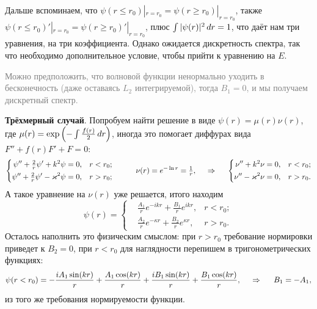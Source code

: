 Дальше вспоминаем, что $\psi(r \leq r_0) |_{r=r_0} = \psi(r \geq r_0) |_{r=r_0}$, также $\psi(r \leq r_0)' |_{r=r_0} = \psi(r \geq r_0)' |_{r=r_0}$, плюс $\int |\psi(r)|^2 \, d r = 1$, что даёт нам три уравнения, на три коэффициента. Однако ожидается дискретность спектра, так что необходимо дополнительное условие, чтобы прийти к уравнению на $E$. 

\textcolor{gray}{
Можно предположить, что волновой функции ненормально уходить в бесконечность (даже оставаясь $L_2$ интегрируемой), тогда $B_1 = 0$, и мы получаем дискретный спектр. 
}


















\textbf{Трёхмерный случай}. Попробуем найти решение в виде $\psi(r) = \mu(r) \nu(r)$, где $\mu(r) = \exp\left(
    - \int \frac{f(r)}{2} \, d r
\right)$, иногда это помогает диффурах вида $F'' + f(r) F' + F = 0$:
\begin{equation*}
    \left\{\begin{aligned}
        \psi'' + \tfrac{2}{r} \psi' + k^2 \psi &= 0,  &r < r_0; \\
        \psi'' + \tfrac{2}{r} \psi' - \kappa^2 \psi &= 0, &r > r_0;
    \end{aligned}\right.
    \hspace{10 mm} 
    \nu(r) = e^{- \ln r} = \tfrac{1}{r},
    \hspace{0.5cm} \Rightarrow \hspace{0.5cm}
    \left\{\begin{aligned}
         \nu'' + k^2 \nu &= 0,  &r < r_0; \\
         \nu'' - \kappa^2 \nu &= 0, &r > r_0.
    \end{aligned}\right.
\end{equation*}
А такое уравнение на $\nu(r)$ уже решается, итого находим
\begin{equation*}
    \psi(r) = \left\{\begin{aligned}
        &\tfrac{A_1}{r} e^{- i k r} + \tfrac{B_1}{r} e^{i k r}, &r<r_0; \\
        &\tfrac{A_2}{r} e^{- \kappa r} + \tfrac{B_2}{r} e^{\kappa r}, &r>r_0.
    \end{aligned}\right.
\end{equation*}
Осталось наполнить это физическим смыслом: при $r > r_0$ требование нормировки приведет к $B_2 = 0$, при $r < r_0$ для наглядности перепишем в тригонометрических функциях:
\begin{equation*}
    \psi(r < r_0) = -\frac{i A_1 \sin (k r)}{r}+\frac{A_1 \cos (k r)}{r}+\frac{i B_1 \sin (k r)}{r}+\frac{B_1 \cos (k r)}{r},
    \hspace{0.5cm} \Rightarrow \hspace{0.5cm}
    B_1 = -A_1,
\end{equation*}
из того же требования нормируемости функции. 

